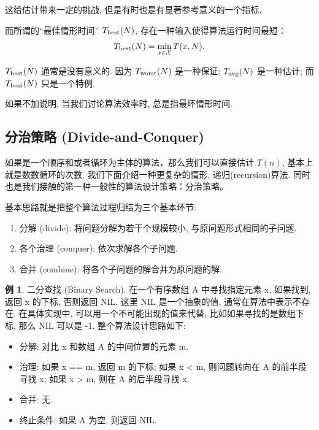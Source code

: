 \documentclass[a4paper]{ctexart}
\theoremstyle{definition}
\theoremstyle{definition}
\newtheorem{example}{例}[section]
\begin{document}
这给估计带来一定的挑战,
但是有时也是有显著参考意义的一个指标.

而所谓的``最佳情形时间'' $T_{\rm best}(N)$, 存在一种输入使得算法运行时间最短：
$$
T_{\rm best}(N) = \min_{x \in \mathcal{X}} T(x, N).
$$

$T_{\rm best}(N)$ 通常是没有意义的. 因为 $T_{\rm worst} (N)$ 是一种保证; $T_{\rm avg} (N)$ 是一种估计; 而
$T_{\rm best}(N)$ 只是一个特例.

如果不加说明, 当我们讨论算法效率时, 总是指最坏情形时间.

\subsection{分治策略 (Divide-and-Conquer)}

如果是一个顺序和或者循环为主体的算法，那么我们可以直接估计 $T(n)$, 基本上就是数数循环的次数.
我们下面介绍一种更复杂的情形, 递归(recursion)算法. 同时也是我们接触的第一种一般性的算法设计策略：分治策略。

基本思路就是把整个算法过程归结为三个基本环节: 
\begin{enumerate}
  \item 分解 (divide): 将问题分解为若干个规模较小, 与原问题形式相同的子问题.
  \item 各个治理 (conquer): 依次求解各个子问题.
  \item 合并 (combine): 将各个子问题的解合并为原问题的解.
\end{enumerate}

\begin{example}
  二分查找 (Binary Search). 在一个有序数组 A 中寻找指定元素 x, 如果找到, 返回 x 的下标, 否则返回 NIL. 这里 NIL 是一个抽象的值, 
  通常在算法中表示不存在. 在具体实现中, 可以用一个不可能出现的值来代替, 比如如果寻找的是数组下标, 那么 NIL 可以是 -1. 整个算法设计思路如下: 
  \begin{itemize}
    \item 分解: 对比 x 和数组 A 的中间位置的元素 m.
    \item 治理: 如果 x == m, 返回 m 的下标; 如果 x < m, 则问题转向在 A 的前半段寻找 x; 如果 x > m, 则在 A 的后半段寻找 x.
    \item 合并: 无.
    \item 终止条件: 如果 A 为空, 则返回 NIL. 
  \end{itemize}
\end{example}
\end{document}
